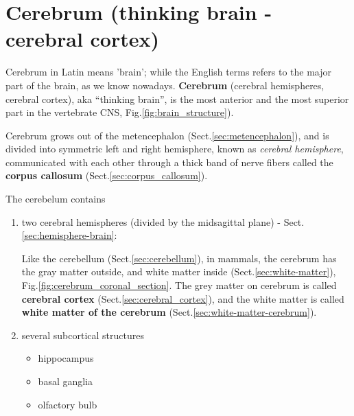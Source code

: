   
\section{Cerebrum (thinking brain - cerebral cortex)}
\label{sec:cerebrum}
\label{sec:cerebral-hemisphere}
\label{sec:cerebral-cortex}

Cerebrum in Latin means 'brain'; while the English terms refers to the major
part of the brain, as we know nowadays.  {\bf Cerebrum} (cerebral hemispheres,
cerebral cortex), aka ``thinking brain'', is the most anterior and the most
superior part in the vertebrate CNS, Fig.\ref{fig:brain_structure}).

Cerebrum grows out of the metencephalon (Sect.\ref{sec:metencephalon}), and is
divided into symmetric left and right hemisphere, known as {\it cerebral
hemisphere}, communicated with each other through a thick band of nerve fibers
called the {\bf corpus callosum} (Sect.\ref{sec:corpus_callosum}).

The cerebelum contains
\begin{enumerate}
  \item two cerebral hemispheres (divided by the midsagittal plane) -
  Sect.\ref{sec:hemisphere-brain}:   
  

Like the cerebellum (Sect.\ref{sec:cerebellum}), in mammals, the cerebrum has
the gray matter outside, and white matter inside (Sect.\ref{sec:white-matter}),
Fig.\ref{fig:cerebrum_coronal_section}. The grey matter on cerebrum is called
{\bf cerebral cortex} (Sect.\ref{sec:cerebral_cortex}), and the white matter is
called {\bf white matter of the cerebrum}
(Sect.\ref{sec:white-matter-cerebrum}).
  
  \item several subcortical structures
  \begin{itemize}
  \item hippocampus
  \item basal ganglia
  \item olfactory bulb
  \end{itemize}
\end{enumerate}

%   
% 


